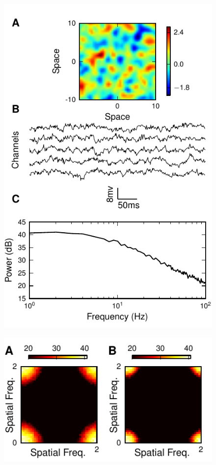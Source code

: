 \documentclass[review,authoryear,3p]{elsarticle}
\begin{document}
\begin{figure}[!ht]
\begin{center}
\includegraphics{./Graph/pdf/fig3.pdf}
\end{center}
\caption{}
\label{fig:Figure3}
\end{figure}
\clearpage
\newpage
\begin{figure}[!ht]
\begin{center}
\includegraphics{./Graph/pdf/fig4.pdf}
\end{center}
\caption{}
\label{fig:Figure4}
\end{figure}
\end{document}
